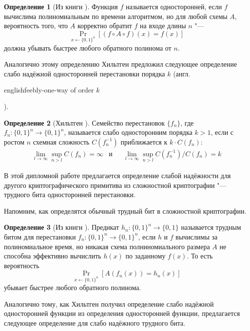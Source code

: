 \documentclass[oneside, a4paper]{article}
\theoremstyle{definition}
\newtheorem{definition}{Определение}
\theoremstyle{remark}
\begin{document}
\begin{definition}[Из книги \cite{goldreich}]
Функция $f$ называется односторонней, если $f$ вычислима полиномиальным по
времени алгоритмом, но для любой схемы $A$, вероятность того, что $A$ корректно
обратит $f$ на входе длины $n$ "---
\[
\Pr_{x \gets \{0, 1\}^n}[(f \circ A \circ f)(x) = f(x)]
\]
должна убывать быстрее любого обратного полинома от $n$.
\end{definition}

Аналогично этому определению Хильтген \cite{hiltgen1993} предложил
следующее определение слабо надёжной односторонней перестановки порядка
$k$ (англ. \begin{foreignlanguage}{english}feebly-one-way of order
$k$\end{foreignlanguage}).

\begin{definition}[Хильтген \cite{hiltgen1993}]
Семейство перестановок $\{f_n\}$, где $f_n : \{0, 1\}^n \to \{0, 1\}^n$,
называется слабо односторонним порядка $k > 1$, если с ростом $n$ схемная
сложность $C(f_n^{-1})$ приближается к $k \cdot C(f_n)$:
\[
\begin{aligned}
&\lim_{l \to \infty} \sup_{n > l} C(f_n) = \infty
&
\text{и}&
&
\lim_{l \to \infty} \sup_{n > l} C(f_n^{-1}) / C(f_n) = k&
\end{aligned}
\]
\end{definition}

В этой дипломной работе предлагается определение слабой надёжности для другого
криптографического примитива из сложностной криптографии "--- трудного бита
односторонней перестановки.

Напомним, как определятся обычный трудный бит в сложностной криптографии.

\begin{definition}[Из книги \cite{goldreich}]
Предикат $h_n : \{0, 1\}^n \to \{0, 1\}$ называется трудным битом для
перестановки $f_n : \{0, 1\}^n \to \{0, 1\}^n$, если $h$ и $f$ вычислимы за
полиномиальное время, но никакая схема полниномиального размера $A$ не способна
эффективно вычислить $h(x)$ по заданному $f(x)$. То есть вероятность
\[
\Pr_{x \gets \{0, 1\}^n}[A(f_n(x)) = h_n(x)]
\]
убывает быстрее любого обратного полинома.
\end{definition}

Аналогично тому, как Хильтген получил определение слабо надёжной односторонней
функции из определения односторонней функции, предлагается следующее определение
для слабо надёжного трудного бита.
\end{document}
